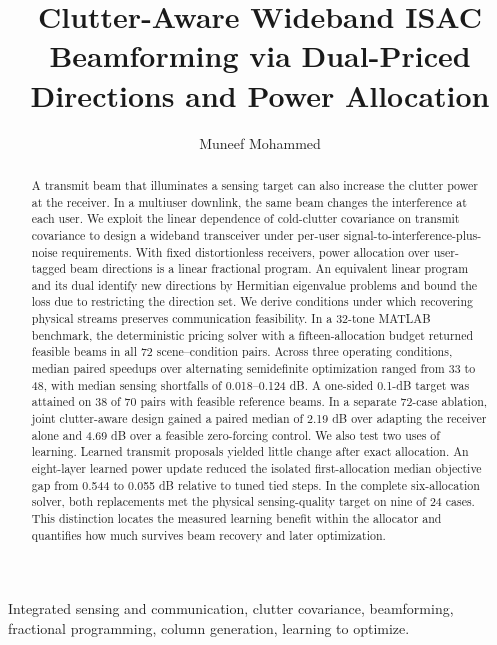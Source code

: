 \documentclass[journal]{IEEEtran}
\title{Clutter-Aware Wideband ISAC Beamforming via Dual-Priced Directions and Power Allocation}
\author{Muneef Mohammed}
\begin{document}
\maketitle
\setlength{\abovedisplayskip}{7pt plus 2pt minus 2pt}
\setlength{\belowdisplayskip}{7pt plus 2pt minus 2pt}
\setlength{\jot}{2pt}
\begin{abstract}
A transmit beam that illuminates a sensing target can also increase the clutter power at the receiver. In a multiuser downlink, the same beam changes the interference at each user. We exploit the linear dependence of cold-clutter covariance on transmit covariance to design a wideband transceiver under per-user signal-to-interference-plus-noise requirements. With fixed distortionless receivers, power allocation over user-tagged beam directions is a linear fractional program. An equivalent linear program and its dual identify new directions by Hermitian eigenvalue problems and bound the loss due to restricting the direction set. We derive conditions under which recovering physical streams preserves communication feasibility. In a 32-tone MATLAB benchmark, the deterministic pricing solver with a fifteen-allocation budget returned feasible beams in all 72 scene--condition pairs. Across three operating conditions, median paired speedups over alternating semidefinite optimization ranged from 33 to 48, with median sensing shortfalls of 0.018--0.124 dB. A one-sided 0.1-dB target was attained on 38 of 70 pairs with feasible reference beams. In a separate 72-case ablation, joint clutter-aware design gained a paired median of 2.19 dB over adapting the receiver alone and 4.69 dB over a feasible zero-forcing control. We also test two uses of learning. Learned transmit proposals yielded little change after exact allocation. An eight-layer learned power update reduced the isolated first-allocation median objective gap from 0.544 to 0.055 dB relative to tuned tied steps. In the complete six-allocation solver, both replacements met the physical sensing-quality target on nine of 24 cases. This distinction locates the measured learning benefit within the allocator and quantifies how much survives beam recovery and later optimization.
\end{abstract}
\begin{IEEEkeywords}
Integrated sensing and communication, clutter covariance, beamforming, fractional programming, column generation, learning to optimize.
\end{IEEEkeywords}
\end{document}
